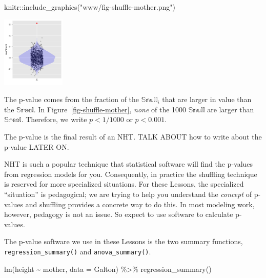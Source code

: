 \documentclass[
  letterpaper,
  DIV=11,
  numbers=noendperiod,
  oneside]{scrreprt}
\newenvironment{Shaded}{\begin{snugshade}}{\end{snugshade}}
\newcommand{\AttributeTok}[1]{\textcolor[rgb]{0.40,0.45,0.13}{#1}}
\newcommand{\FunctionTok}[1]{\textcolor[rgb]{0.28,0.35,0.67}{#1}}
\newcommand{\NormalTok}[1]{\textcolor[rgb]{0.00,0.23,0.31}{#1}}
\newcommand{\SpecialCharTok}[1]{\textcolor[rgb]{0.37,0.37,0.37}{#1}}
\newcommand{\StringTok}[1]{\textcolor[rgb]{0.13,0.47,0.30}{#1}}
\begin{document}
\begin{Shaded}
\begin{Highlighting}[]
\NormalTok{knitr}\SpecialCharTok{::}\FunctionTok{include\_graphics}\NormalTok{(}\StringTok{"www/fig{-}shuffle{-}mother.png"}\NormalTok{)}
\end{Highlighting}
\end{Shaded}

\begin{marginfigure}

{\centering \includegraphics[width=1.19in,height=\textheight]{./www/fig-shuffle-mother.png}

}

\end{marginfigure}

The p-value comes from the fraction of the \(\mathbb{Snull}_i\) that are
larger in value than the \(\mathbb{Sreal}\). In
Figure~\ref{fig-shuffle-mother}, \emph{none} of the 1000
\(\mathbb{Snull}\) are larger than \(\mathbb{Sreal}\). Therefore, we
write \(p < 1/1000\) or \(p < 0.001\).

The p-value is the final result of an NHT. TALK ABOUT how to write about
the p-value LATER ON.

NHT is such a popular technique that statistical software will find the
p-values from regression models for you. Consequently, in practice the
shuffling technique is reserved for more specialized situations. For
these Lessons, the specialized ``situation'' is pedagogical; we are
trying to help you understand the \emph{concept} of p-values and
shuffling provides a concrete way to do this. In most modeling work,
however, pedagogy is not an issue. So expect to use software to
calculate p-values.

The p-value software we use in these Lessons is the two summary
functions, \texttt{regression\_summary()} and \texttt{anova\_summary()}.

\begin{Shaded}
\begin{Highlighting}[]
\FunctionTok{lm}\NormalTok{(height }\SpecialCharTok{\textasciitilde{}}\NormalTok{ mother, }\AttributeTok{data =}\NormalTok{ Galton) }\SpecialCharTok{\%\textgreater{}\%} \FunctionTok{regression\_summary}\NormalTok{()}
\end{Highlighting}
\end{Shaded}
\end{document}
